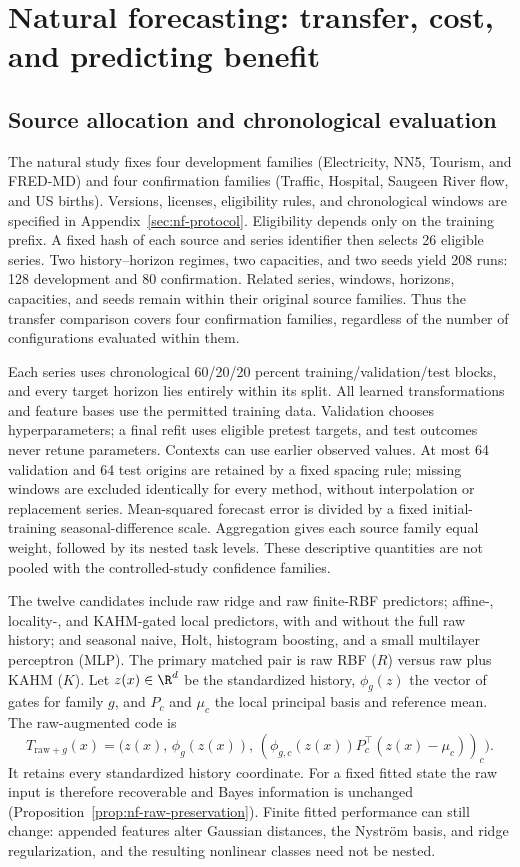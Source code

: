 \section{Natural forecasting: transfer, cost, and predicting benefit}\label{sec:natural}

\subsection{Source allocation and chronological evaluation}
The natural study fixes four development families (Electricity, NN5,
Tourism, and FRED-MD) and four confirmation families (Traffic, Hospital,
Saugeen River flow, and US births). Versions, licenses, eligibility rules,
and chronological windows are specified in Appendix~\ref{sec:nf-protocol}.
Eligibility depends only on the training prefix. A fixed hash of each
source and series identifier then selects 26 eligible series.
Two history--horizon regimes, two capacities, and two seeds yield 208 runs:
128 development and 80 confirmation. Related series, windows, horizons,
capacities, and seeds remain within their original source families.
Thus the transfer comparison covers four confirmation families,
regardless of the number of configurations evaluated within them.

Each series uses chronological 60/20/20 percent training/validation/test
blocks, and every target horizon lies entirely within its split. All
learned transformations and feature bases use the permitted training
data. Validation chooses hyperparameters; a final refit uses eligible
pretest targets, and test outcomes never retune parameters. Contexts can
use earlier observed values. At most 64 validation and 64 test origins
are retained by a fixed spacing rule; missing windows are excluded
identically for every method, without interpolation or replacement series.
Mean-squared forecast error is divided by a fixed initial-training
seasonal-difference scale. Aggregation gives each source family equal
weight, followed by its nested task levels. These descriptive quantities
are not pooled with the controlled-study confidence families.

The twelve candidates include raw ridge and raw finite-RBF predictors;
affine-, locality-, and KAHM-gated local predictors, with and without the
full raw history; and seasonal naive, Holt, histogram boosting, and a small multilayer perceptron (MLP). The primary matched pair is raw RBF ($R$) versus raw plus KAHM ($K$).
Let $z(x)\in\R^d$ be the standardized history, $\phi_g(z)$ the
vector of gates for family $g$, and $P_c$ and $\mu_c$ the local
principal basis and reference mean. The raw-augmented code is
\begin{equation}\label{eq:natural-raw}
 T_{\mathrm{raw}+g}(x)=\bigl(z(x),\,\phi_g(z(x)),\,
       (\phi_{g,c}(z(x))P_c^\top(z(x)-\mu_c))_c\bigr).
\end{equation}
It retains every standardized history coordinate. For a fixed fitted state
the raw input is therefore recoverable and Bayes information is unchanged
(Proposition~\ref{prop:nf-raw-preservation}). Finite fitted performance
can still change: appended features alter Gaussian distances, the
Nystr\"om basis, and ridge regularization, and the resulting nonlinear
classes need not be nested.


